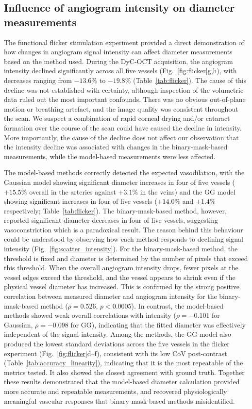 \subsection{Influence of angiogram intensity on diameter measurements}
\label{subsec:influence_of_intensity}
The functional flicker stimulation experiment provided a direct demonstration of how changes in angiogram signal intensity can affect diameter measurements based on the method used. During the DyC-OCT acquisition, the angiogram intensity declined significantly across all five vessels (Fig.~\ref{fig:flicker}g,h), with decreases ranging from $-13.6\%$ to $-19.8\%$ (Table~\ref{tab:flicker}). The cause of this decline was not established with certainty, although inspection of the volumetric data ruled out the most important confounds. There was no obvious out-of-plane motion or breathing artefact, and the image quality was consistent throughout the scan. We suspect a combination of rapid corneal drying and/or cataract formation over the course of the scan could have caused the decline in intensity. More importantly, the cause of the decline does not affect our observation that the intensity decline was associated with changes in the binary-mask-based measurements, while the model-based measurements were less affected. 

The model-based methods correctly detected the expected vasodilation, with the Gaussian model showing significant diameter increases in four of five vessels ($+15.5\%$ overall in the arteries against $+3.1\%$ in the veins) and the GG model showing significant increases in four of five vessels ($+14.0\%$ and $+1.4\%$ respectively; Table~\ref{tab:flicker}). The binary-mask-based method, however, reported significant diameter decreases in four of five vessels, suggesting vasoconstriction which is a paradoxical result. The reason behind this behaviour could be understood by observing how each method responds to declining signal intensity (Fig.~\ref{fig:scatter_intensity}). For the binary-mask-based method, the threshold is fixed and diameter is determined by the number of pixels that exceed this threshold. When the overall angiogram intensity drops, fewer pixels at the vessel edges exceed the threshold, and the vessel appears to shrink even if the physical vessel diameter has increased. This is confirmed by the strong positive correlation between measured diameter and angiogram intensity for the binary-mask-based method ($\rho = 0.526$, $p < 0.0005$). In contrast, the model-based methods showed weak overall correlations with intensity ($\rho = -0.101$ for Gaussian, $\rho = -0.098$ for GG), indicating that the fitted diameter was effectively independent of the signal intensity. Among the methods, the GG model also produced the lowest standard deviations across the five vessels in the flicker experiment (Fig.~\ref{fig:flicker}d--f), consistent with its low CoV post-contrast (Table~\ref{tab:accuracy_linearity}), indicating that it is the most repeatable of the metrics tested. It also showed the closest agreement with ground truth. Together these results demonstrated that the model-based diameter calculation provided more accurate and repeatable measurements, and recovered physiologically meaningful vascular responses that binary-mask-based methods misidentified.

